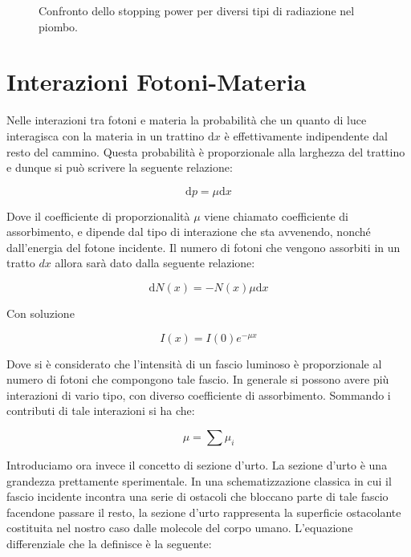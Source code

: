 \begin{figure} []
\centering
		\caption{Confronto dello stopping power per diversi tipi di radiazione nel piombo.}
         \label{stoppingpower}
\end{figure}


\section{Interazioni Fotoni-Materia}


Nelle interazioni tra fotoni e materia la probabilità che un quanto di luce interagisca con la materia in un trattino $\mathrm{d}x$ è effettivamente indipendente dal resto del cammino. Questa probabilità è proporzionale alla larghezza del trattino e dunque si può scrivere la seguente relazione:

\begin{equation}
\mathrm{d}p=\mu \mathrm{d}x
\end{equation}

Dove il coefficiente di proporzionalità $\mu$ viene chiamato coefficiente di assorbimento, e dipende dal tipo di interazione che sta avvenendo, nonché dall'energia del fotone incidente. Il numero di fotoni che vengono assorbiti in un tratto $dx$ allora sarà dato dalla seguente relazione:

\begin{equation}
\mathrm{d}N(x)=-N(x)\mu \mathrm{d}x
\end{equation}

Con soluzione

\begin{equation}
I(x)=I(0)e^{-\mu x}
\label{Intensity}
\end{equation}

Dove si è considerato che l'intensità di un fascio luminoso è proporzionale al numero di fotoni che compongono tale fascio.
In generale si possono avere più interazioni di vario tipo, con diverso coefficiente di assorbimento. Sommando i contributi di tale interazioni si ha che:

\begin{equation}
\mu=\sum \mu_{i}
\end{equation}

Introduciamo ora invece il concetto di sezione d'urto. 
La sezione d'urto è una grandezza prettamente sperimentale. In una schematizzazione classica in cui il fascio incidente incontra una serie di ostacoli che bloccano parte di tale fascio facendone passare il resto, la sezione d'urto rappresenta la superficie ostacolante costituita nel nostro caso dalle molecole del corpo umano. L'equazione differenziale che la definisce è la seguente:

